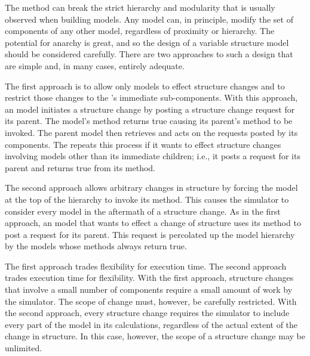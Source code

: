 The  method can break the strict hierarchy and modularity that is usually observed when building  models. Any  model can, in principle, modify the set of components of any other model, regardless of proximity or hierarchy. The potential for anarchy is great, and so the design of a variable structure model should be considered carefully. There are two approaches to such a design that are simple and, in many cases, entirely adequate.

The first approach is to allow only  models to effect structure changes and to restrict those changes to the 's immediate sub-components. With this approach, an  model initiates a structure change by posting a structure change request for its parent. The  model's  method returns true causing its parent's  method to be invoked. The parent  model then retrieves and acts on the requests posted by its components. The  repeats this process if it wants to effect structure changes involving models other than its immediate children; i.e., it posts a request for its parent and returns true from its  method.

The second approach allows arbitrary changes in structure by forcing the model at the top of the hierarchy to invoke its  method. This causes the simulator to consider every model in the aftermath of a structure change. As in the first approach, an  model that wants to effect a change of structure uses its  method to post a request for its parent. This request is percolated up the model hierarchy by the  models whose  methods always return true. 

The first approach trades flexibility for execution time. The second approach trades execution time for flexibility. With the first approach, structure changes that involve a small number of components require a small amount of work by the simulator. The scope of change must, however, be carefully restricted. With the second approach, every structure change requires the simulator to include every part of the model in its calculations, regardless of the actual extent of the change in structure. In this case, however, the scope of a structure change may be unlimited.

